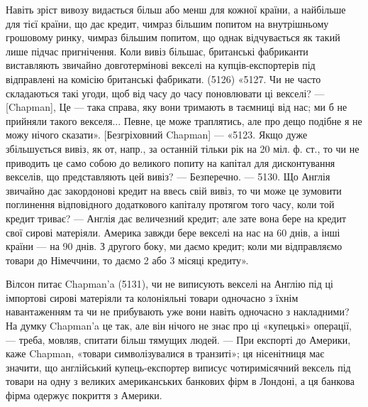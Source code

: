 \parcont{}  %
Навіть зріст вивозу видається більш або менш для кожної країни, а найбільше
для тієї країни, що дає кредит, чимраз більшим попитом на внутрішньому
грошовому ринку, чимраз більшим попитом, що однак відчувається як
такий лише підчас пригнічення. Коли вивіз більшає, британські фабриканти виставляють
звичайно довготермінові векселі на купців-експортерів під відправлені
на комісію британські фабрикати. (5126) «5127. Чи не часто складаються такі
угоди, щоб від часу до часу поновлювати ці векселі? — [Chapman], Це — така
справа, яку вони тримають в таємниці від нас; ми б не прийняли такого векселя...
Певне, це може траплятись, але про дещо подібне я не можу нічого
сказати». [Безгріховний Chapman] — «5123. Якщо дуже збільшується вивіз, як
от, напр., за останній тільки рік на 20 міл. ф. ст., то чи не приводить це само
собою до великого попиту на капітал для дисконтування векселів, що представляють
цей вивіз? — Безперечно. — 5130. Що Англія звичайно дає закордонові
кредит на ввесь свій вивіз, то чи може це зумовити поглинення відповідного
додаткового капіталу протягом того часу, коли той кредит триває? —
Англія дає величезний кредит; але зате вона бере на кредит свої сирові
матеріяли. Америка завжди бере векселі на нас на 60 днів, а інші країни — на
90 днів. З другого боку, ми даємо кредит; коли ми відправляємо товари до
Німеччини, то даємо 2 або 3 місяці кредиту».

Вілсон питає Chapman’a (5131), чи не виписують векселі на Англію під
ці імпортові сирові матеріяли та колоніяльні товари одночасно з їхнім навантаженням
та чи не прибувають уже вони навіть одночасно з накладними? На
думку Chapman’a це так, але він нічого не знає про ці «купецькі» операції, —
треба, мовляв, спитати більш тямущих людей. — При експорті до Америки, каже
Chapman, «товари символізувалися в транзиті»; ця нісенітниця має значити, що
англійський купець-експортер виписує чотиримісячний вексель під товари на
одну з великих американських банкових фірм в Лондоні, а ця банкова фірма
одержує покриття з Америки.

